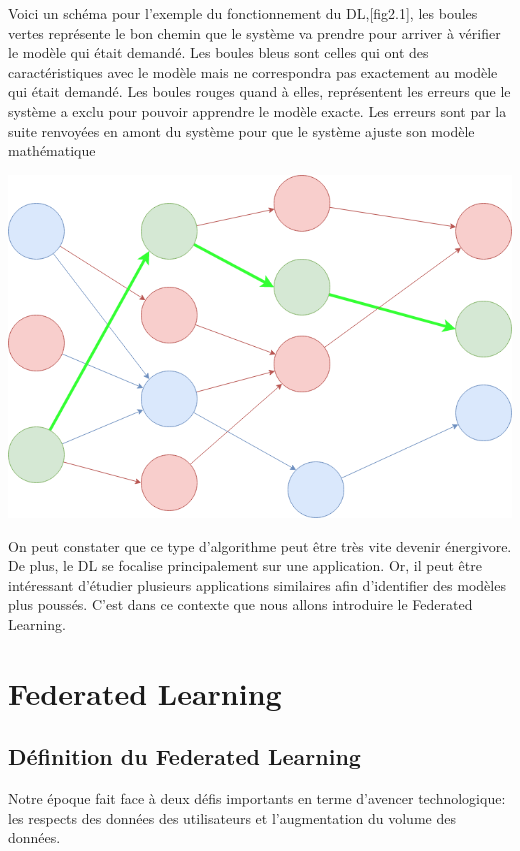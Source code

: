 \documentclass[12pt,a4paper]{report}
\begin{document}
Voici un schéma pour l'exemple du fonctionnement du DL,[fig2.1], les boules vertes représente le bon chemin que le système va prendre pour arriver à vérifier le modèle qui était demandé. Les boules bleus sont celles qui ont des caractéristiques avec le modèle mais ne correspondra pas exactement au modèle qui était demandé. Les boules rouges quand à elles, représentent les erreurs que le système a exclu pour pouvoir apprendre le modèle exacte. Les erreurs sont par la suite renvoyées en amont du système pour que le système ajuste son modèle mathématique

\begin{center}
	\includegraphics[scale=0.4]{deep_learning_schema}
	\label{fig1}
\end{center}

On peut constater que ce type d'algorithme peut être très vite devenir énergivore. De plus, le DL se focalise principalement sur une application. Or, il peut être intéressant d'étudier plusieurs applications similaires afin d'identifier des modèles plus poussés. C'est dans ce contexte que nous allons introduire le Federated Learning.


\chapter{Federated Learning}
\section{Définition du Federated Learning}


Notre époque fait face à deux défis importants en terme d'avencer technologique: les respects des données des utilisateurs et l'augmentation du volume des données.
\end{document}
